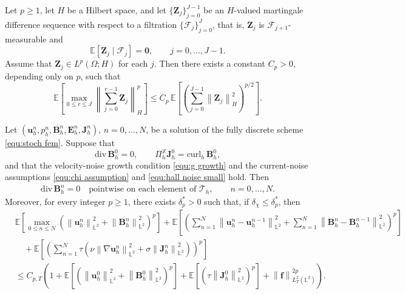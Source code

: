 \documentclass[10pt,a4paper]{amsart}
\newcommand{\bb}{\mathbb}
\newcommand{\bff}{\boldsymbol}
\newcommand{\curlh}{\mathrm{curl}_h\,}
\newcommand{\divg}{\mathrm{div}\,}
\newcommand{\norm}[2]{\left\|{#1}\right\|_{#2}}
\begin{document}
\begin{lemma}\label{lem:discrete-BDG}
	Let $p\ge 1$, let $H$ be a Hilbert space, and let
	$\{\bff Z_j\}_{j=0}^{J-1}$ be an $H$-valued martingale difference sequence
	with respect to a filtration \(\{\mathcal F_j\}_{j=0}^{J}\), that is,
	\(\bff Z_j\) is \(\mathcal F_{j+1}\)-measurable and
	\[
	\mathbb E[\bff Z_j\mid\mathcal F_j]=\bff0,
	\qquad
	j=0,\ldots,J-1.
	\]
	Assume that \(\bff Z_j\in L^p(\Omega;H)\) for each \(j\). Then there exists
	a constant \(C_p>0\), depending only on \(p\), such that
	\begin{equation}\label{eq:discrete-BDG-square-function}
		\bb E\left[
		\max_{0\le r\le J}
		\norm{\sum_{j=0}^{r-1}\bff Z_j}{H}^{p}
		\right]
		\le
		C_p\,
		\bb E\left[
		\left(
		\sum_{j=0}^{J-1}\norm{\bff Z_j}{H}^{2}
		\right)^{p/2}
		\right].
	\end{equation}
\end{lemma}

\begin{proposition}
	\label{prop:stoch stability revised}
	Let $(\bff{u}_h^n,p_h^n,\bff{B}_h^n,\bff{E}_h^n,\bff{J}_h^n)$, $n=0,\ldots,N$, be a solution of the fully discrete scheme \eqref{equ:stoch fem}. Suppose that
	\[
	\divg\bff{B}_h^0=0,
	\qquad
	\Pi_h^{\bb{X}} \bff{J}_h^0=\curlh\bff{B}_h^0,
	\]
	and that the velocity-noise growth condition \eqref{equ:g growth} and the current-noise assumptions \eqref{equ:chi assumption} and \eqref{equ:hall noise small} hold.
	Then
	\begin{align}\label{equ:div B exact revised}
		\divg\bff{B}_h^n=0
		\quad\text{pointwise on each element of }\mathcal T_h,
		\qquad n=0,\ldots,N.
	\end{align}
	Moreover, for every integer $p\ge1$, there exists
	$\delta_{p}^\ast>0$ such that, if
	$\delta_\chi\le \delta_{p}^\ast$, then
	\begin{align}\label{equ:stoch stability revised main}
		&\bb E \left[\max_{0\le n\le N}
		\left(
		\norm{\bff u_h^n}{\bb L^2}^2
		+
		\norm{\bff B_h^n}{\bb L^2}^2
		\right)^p\right]
		+
		\bb E\left[
		\left(
		\sum_{n=1}^{N}
		\norm{\bff u_h^n-\bff u_h^{n-1}}{\bb L^2}^2
		+
		\sum_{n=1}^{N}
		\norm{\bff B_h^n-\bff B_h^{n-1}}{\bb L^2}^2
		\right)^p
		\right]
		\nonumber\\
		&\quad
		+
		\bb E\left[
		\left(
		\sum_{n=1}^{N}\tau
		\left(
		\nu\norm{\nabla\bff u_h^n}{\bb L^2}^2
		+
		\sigma\norm{\bff J_h^n}{\bb L^2}^2
		\right)
		\right)^p
		\right]
		\nonumber\\
		&\le
		C_{p,T}
		\left(
		1
		+
		\bb E\left[
		\left(
		\norm{\bff u_h^0}{\bb L^2}^2
		+
		\norm{\bff B_h^0}{\bb L^2}^2
		\right)^p
		\right]
		+
		\bb E\left[
		\left(
		\tau\norm{\bff J_h^0}{\bb L^2}^2
		\right)^p
		\right]
		+
		\norm{\bff f}{L^2_T(\bb L^2)}^{2p}
		\right).
	\end{align}
\end{proposition}
\end{document}
